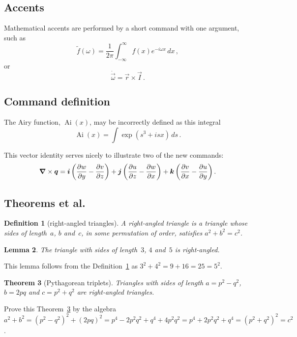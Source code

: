 \documentclass[9pt]{memoir}
\begin{document}
\subsection{Accents}

Mathematical accents are performed by a short command with one 
argument, such as
\[
	\tilde f(\omega)=\frac{1}{2\pi}
	\int_{-\infty}^\infty f(x)e^{-i\omega x}\,dx\,,
\]
or
\[
	\dot{\vec \omega}=\vec r\times\vec I\,.
\]

\subsection{Command definition}

\newcommand{\Ai}{\operatorname{Ai}} 
The Airy function, $\Ai(x)$, may be incorrectly defined as this 
integral
\[
	\Ai(x)=\int\exp(s^3+isx)\,ds\,.
\]

\newcommand{\D}[2]{\frac{\partial #2}{\partial #1}}
\newcommand{\DD}[2]{\frac{\partial^2 #2}{\partial #1^2}}
\renewcommand{\vec}[1]{\text{\boldmath$#1$}}

This vector identity serves nicely to illustrate two of the new 
commands:
\[
	\vec\nabla\times\vec q
	=\vec i\left(\D yw-\D zv\right)
	+\vec j\left(\D zu-\D xw\right)
	+\vec k\left(\D xv-\D yu\right).
\]


\subsection{Theorems et al.}

\newtheorem{theorem}{Theorem}
\newtheorem{corollary}[theorem]{Corollary}
\newtheorem{lemma}[theorem]{Lemma}
\newtheorem{definition}[theorem]{Definition}

\begin{definition}[right-angled triangles] \label{def:tri}
A \emph{right-angled triangle} is a triangle whose sides of length~\(a\), \(b\) and~\(c\), in some permutation of order, satisfies \(a^2+b^2=c^2\).
\end{definition}

\begin{lemma} 
The triangle with sides of length~\(3\), \(4\) and~\(5\) is right-angled.
\end{lemma}

This lemma follows from the Definition~\ref{def:tri} as \(3^2+4^2=9+16=25=5^2\).

\begin{theorem}[Pythagorean triplets] \label{thm:py}
Triangles with sides of length \(a=p^2-q^2\), \(b=2pq\) and \(c=p^2+q^2\) are right-angled triangles.
\end{theorem}

Prove this Theorem~\ref{thm:py} by the algebra \(a^2+b^2 =(p^2-q^2)^2+(2pq)^2
=p^4-2p^2q^2+q^4+4p^2q^2
=p^4+2p^2q^2+q^4
=(p^2+q^2)^2 =c^2\).
\end{document}
